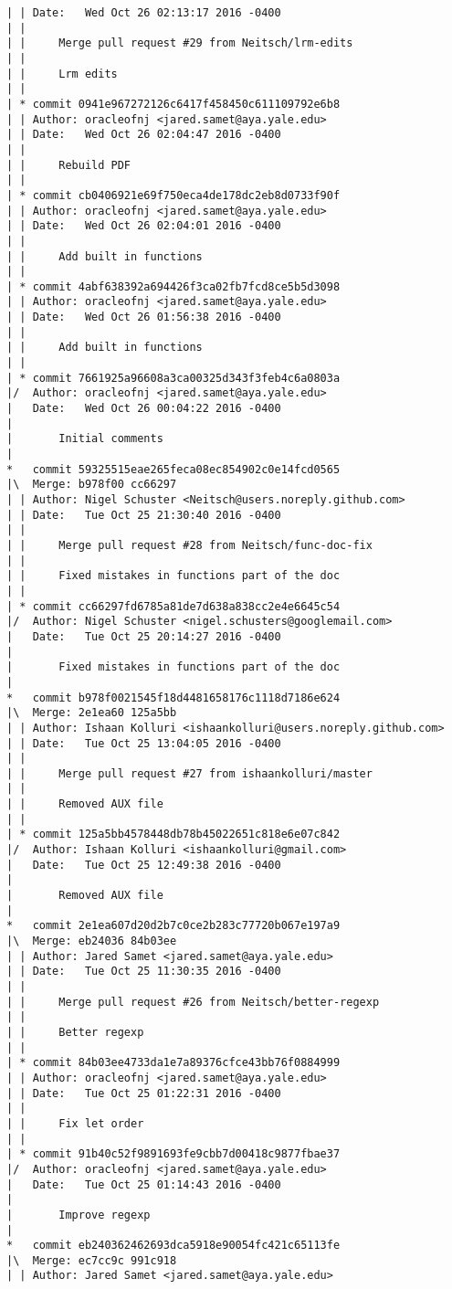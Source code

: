 \begin{lstlisting}
| | Date:   Wed Oct 26 02:13:17 2016 -0400
| | 
| |     Merge pull request #29 from Neitsch/lrm-edits
| |     
| |     Lrm edits
| |   
| * commit 0941e967272126c6417f458450c611109792e6b8
| | Author: oracleofnj <jared.samet@aya.yale.edu>
| | Date:   Wed Oct 26 02:04:47 2016 -0400
| | 
| |     Rebuild PDF
| |   
| * commit cb0406921e69f750eca4de178dc2eb8d0733f90f
| | Author: oracleofnj <jared.samet@aya.yale.edu>
| | Date:   Wed Oct 26 02:04:01 2016 -0400
| | 
| |     Add built in functions
| |   
| * commit 4abf638392a694426f3ca02fb7fcd8ce5b5d3098
| | Author: oracleofnj <jared.samet@aya.yale.edu>
| | Date:   Wed Oct 26 01:56:38 2016 -0400
| | 
| |     Add built in functions
| |   
| * commit 7661925a96608a3ca00325d343f3feb4c6a0803a
|/  Author: oracleofnj <jared.samet@aya.yale.edu>
|   Date:   Wed Oct 26 00:04:22 2016 -0400
|   
|       Initial comments
|    
*   commit 59325515eae265feca08ec854902c0e14fcd0565
|\  Merge: b978f00 cc66297
| | Author: Nigel Schuster <Neitsch@users.noreply.github.com>
| | Date:   Tue Oct 25 21:30:40 2016 -0400
| | 
| |     Merge pull request #28 from Neitsch/func-doc-fix
| |     
| |     Fixed mistakes in functions part of the doc
| |   
| * commit cc66297fd6785a81de7d638a838cc2e4e6645c54
|/  Author: Nigel Schuster <nigel.schusters@googlemail.com>
|   Date:   Tue Oct 25 20:14:27 2016 -0400
|   
|       Fixed mistakes in functions part of the doc
|    
*   commit b978f0021545f18d4481658176c1118d7186e624
|\  Merge: 2e1ea60 125a5bb
| | Author: Ishaan Kolluri <ishaankolluri@users.noreply.github.com>
| | Date:   Tue Oct 25 13:04:05 2016 -0400
| | 
| |     Merge pull request #27 from ishaankolluri/master
| |     
| |     Removed AUX file
| |   
| * commit 125a5bb4578448db78b45022651c818e6e07c842
|/  Author: Ishaan Kolluri <ishaankolluri@gmail.com>
|   Date:   Tue Oct 25 12:49:38 2016 -0400
|   
|       Removed AUX file
|    
*   commit 2e1ea607d20d2b7c0ce2b283c77720b067e197a9
|\  Merge: eb24036 84b03ee
| | Author: Jared Samet <jared.samet@aya.yale.edu>
| | Date:   Tue Oct 25 11:30:35 2016 -0400
| | 
| |     Merge pull request #26 from Neitsch/better-regexp
| |     
| |     Better regexp
| |   
| * commit 84b03ee4733da1e7a89376cfce43bb76f0884999
| | Author: oracleofnj <jared.samet@aya.yale.edu>
| | Date:   Tue Oct 25 01:22:31 2016 -0400
| | 
| |     Fix let order
| |   
| * commit 91b40c52f9891693fe9cbb7d00418c9877fbae37
|/  Author: oracleofnj <jared.samet@aya.yale.edu>
|   Date:   Tue Oct 25 01:14:43 2016 -0400
|   
|       Improve regexp
|    
*   commit eb240362462693dca5918e90054fc421c65113fe
|\  Merge: ec7cc9c 991c918
| | Author: Jared Samet <jared.samet@aya.yale.edu>

\end{lstlisting}
